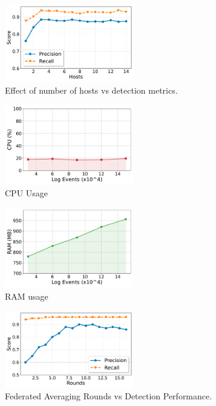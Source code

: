 \begin{figure}[t!]
  \centering
  \includegraphics[width=0.50\textwidth]{fig/scoresvshosts.pdf}
  \caption{Effect of number of hosts vs detection metrics.}
  \label{scoresvshosts}
  \vspace{-2ex}
\end{figure}

\begin{figure}[t!]
  \centering
  \includegraphics[width=0.50\textwidth]{fig/cpu.pdf}
  \caption{CPU Usage}
  \label{cpu}
  \vspace{-2ex}
\end{figure}

\begin{figure}[t!]
  \centering
  \includegraphics[width=0.50\textwidth]{fig/ram.pdf}
  \caption{RAM usage}
  \label{ram}
  \vspace{-2ex}
\end{figure}

\begin{figure}[t!]
  \centering
  \includegraphics[width=0.50\textwidth]{fig/roundsvsscore.pdf}
  \caption{Federated Averaging Rounds vs Detection Performance.}
  \label{roundsvsscore}
  \vspace{-2ex}
\end{figure}

